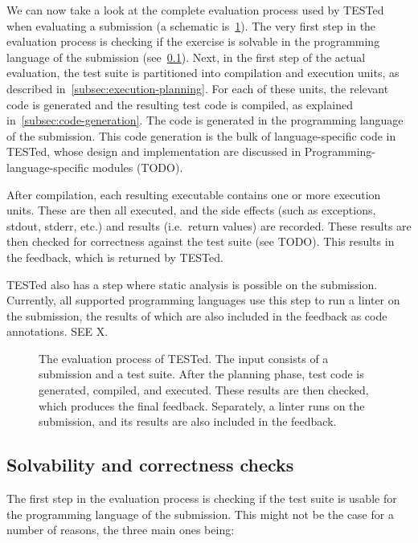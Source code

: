 \documentclass[../main]{subfiles}
\begin{document}
We can now take a look at the complete evaluation process used by TESTed when evaluating a submission (a schematic is~\cref{fig:flow}).
The very first step in the evaluation process is checking if the exercise is solvable in the programming language of the submission (see~\cref{subsec:solvability-and-correctness-checks}).
Next, in the first step of the actual evaluation, the test suite is partitioned into compilation and execution units, as described in~\cref{subsec:execution-planning}.
For each of these units, the relevant code is generated and the resulting test code is compiled, as explained in~\cref{subsec:code-generation}.
The code is generated in the programming language of the submission.
This code generation is the bulk of language-specific code in TESTed, whose design and implementation are discussed in Programming-language-specific modules (TODO).

After compilation, each resulting executable contains one or more execution units.
These are then all executed, and the side effects (such as exceptions, stdout, stderr, etc.) and results (i.e.\ return values) are recorded.
These results are then checked for correctness against the test suite (see TODO).
This results in the feedback, which is returned by TESTed.

TESTed also has a step where static analysis is possible on the submission.
Currently, all supported programming languages use this step to run a linter on the submission, the results of which are also included in the feedback as code annotations. SEE X.

\begin{figure}
    \centering
    
    \caption{
        The evaluation process of TESTed.
        The input consists of a submission and a test suite.
        After the planning phase, test code is generated, compiled, and executed.
        These results are then checked, which produces the final feedback.
        Separately, a linter runs on the submission, and its results are also included in the feedback.
    }
    \label{fig:flow}
\end{figure}

\subsection{Solvability and correctness checks}\label{subsec:solvability-and-correctness-checks}

The first step in the evaluation process is checking if the test suite is usable for the programming language of the submission.
This might not be the case for a number of reasons, the three main ones being:
\end{document}
